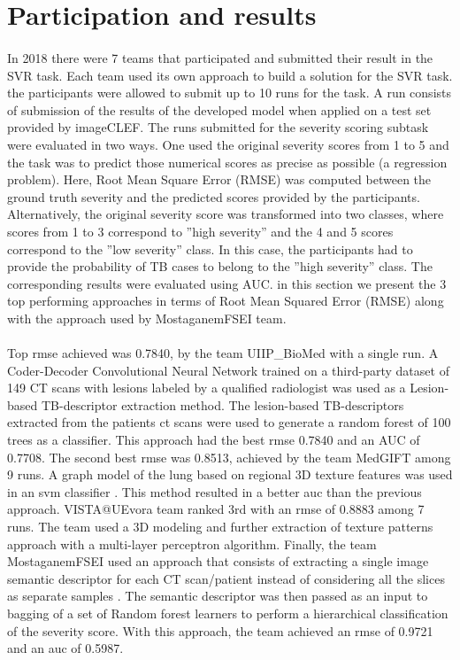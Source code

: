 \section{Participation and results}
\paragraph{}
In 2018 there were 7 teams that participated and submitted their result in the SVR task. Each team used its own approach to build a solution for the SVR task. the participants were allowed to submit up to 10 runs for the task. A run consists of submission
of the results of the developed model when applied on a test set provided by imageCLEF. The runs submitted for the severity scoring subtask were evaluated in two ways. One used the original severity scores from 1 to 5 and the task was to predict those numerical scores as precise as possible (a regression problem). Here, Root Mean Square Error (RMSE) was computed between the ground truth severity and the predicted scores provided by the participants. Alternatively, the original severity score was transformed into two classes, where scores from 1 to 3 correspond to ”high severity” and the 4 and 5 scores correspond to the ”low severity” class. In this case, the participants had to provide the probability of TB cases to belong to the ”high severity” class. The corresponding results were evaluated using AUC. in this section we present the 3 top performing approaches in terms of Root Mean Squared Error (RMSE) along with the approach used by MostaganemFSEI team.
\paragraph{}
Top \acs{rmse} achieved was 0.7840, by the team UIIP\_BioMed with a single run. A Coder-Decoder Convolutional Neural Network trained on a third-party dataset of 149 CT scans with lesions labeled by a qualified radiologist was used as a Lesion-based TB-descriptor extraction method. The lesion-based TB-descriptors extracted from the patients \acs{ct} scans were used to generate a random forest of 100 trees as a classifier\cite{lesionBased}. This approach had the best \acs{rmse} 0.7840 and an AUC of 0.7708. The second best \acs{rmse} was 0.8513, achieved by the team MedGIFT among 9 runs. A graph model of the lung based on regional 3D texture features was used in an \acs{svm} classifier \cite{textureBasedGraphModel}. This method resulted in a better \acs{auc} than the previous approach. VISTA@UEvora team ranked 3rd with an \acs{rmse} of 0.8883 among 7 runs. The team used a 3D modeling and further extraction of texture patterns approach with a multi-layer perceptron algorithm\cite{textureBased3DModel}.
Finally, the team MostaganemFSEI used an approach that consists of extracting a single image semantic descriptor for each CT scan/patient instead of considering all the slices as separate samples \cite{semanticDescriptor}. The semantic descriptor was then passed as an input to bagging of a set of Random forest learners to perform a hierarchical classification of the severity score. With this approach, the team achieved an \acs{rmse} of 0.9721 and an \acs{auc} of 0.5987.

